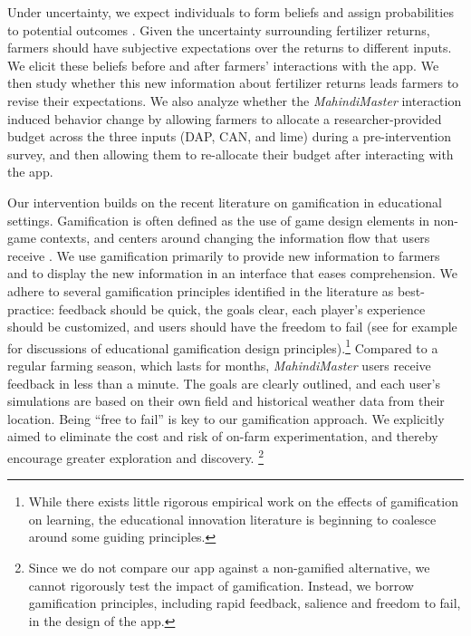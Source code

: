 \documentclass[12pt,letterpaper]{article}
\begin{document}
Under uncertainty, we expect individuals to form beliefs and assign probabilities to potential outcomes \citep{delavande_probabilistic_2014}. Given the uncertainty surrounding fertilizer returns, farmers should have subjective expectations over the returns to different inputs. We elicit these beliefs before and after farmers' interactions with the app. We then study whether this new information about fertilizer returns leads farmers to revise their expectations. We also analyze whether the \textit{MahindiMaster} interaction induced behavior change by allowing farmers to allocate a researcher-provided budget across the three inputs (DAP, CAN, and lime) during a pre-intervention survey, and then allowing them to re-allocate their budget after interacting with the app.


Our intervention builds on the recent literature on gamification in educational settings. Gamification is often defined as the use of game design elements in non-game contexts, and centers around changing the information flow that users receive \citep{walz_gameful_2015}. We use gamification primarily to provide new information to farmers and to display the new information in an interface that eases comprehension. We adhere to several gamification principles identified in the literature as best-practice: feedback should be quick, the goals clear,  each player's experience should be customized, and users should have the freedom to fail (see for example \citealt{simoes_social_2013, lee_gamification_2011,gordon_maximising_2013} for discussions of educational gamification design principles).\footnote{While there exists little rigorous empirical work on the effects of gamification on learning, the educational innovation literature is beginning to coalesce around some guiding principles.} Compared to a regular farming season, which lasts for months, \textit{MahindiMaster} users receive feedback in less than a minute. The goals are clearly outlined, and each user's simulations are based on their own field and historical weather data from their location. Being ``free to fail'' is key to our gamification approach. We explicitly aimed to eliminate the cost and risk of on-farm experimentation, and thereby encourage greater exploration and discovery. \footnote{Since we do not compare our app against a non-gamified alternative, we cannot rigorously test the impact of gamification. Instead, we borrow gamification principles, including rapid feedback, salience and freedom to fail, in the design of the app.}
\end{document}
